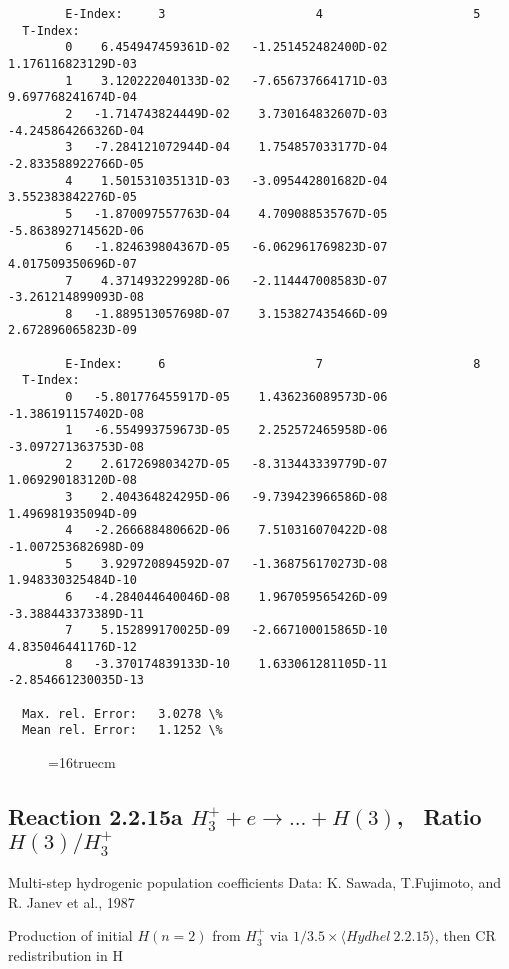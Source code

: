 \documentclass[12pt,dvipdfmx]{article}
\begin{document}
{\begin{small}
\begin{verbatim}
        E-Index:     3                     4                     5
  T-Index:
        0    6.454947459361D-02   -1.251452482400D-02    1.176116823129D-03
        1    3.120222040133D-02   -7.656737664171D-03    9.697768241674D-04
        2   -1.714743824449D-02    3.730164832607D-03   -4.245864266326D-04
        3   -7.284121072944D-04    1.754857033177D-04   -2.833588922766D-05
        4    1.501531035131D-03   -3.095442801682D-04    3.552383842276D-05
        5   -1.870097557763D-04    4.709088535767D-05   -5.863892714562D-06
        6   -1.824639804367D-05   -6.062961769823D-07    4.017509350696D-07
        7    4.371493229928D-06   -2.114447008583D-07   -3.261214899093D-08
        8   -1.889513057698D-07    3.153827435466D-09    2.672896065823D-09

        E-Index:     6                     7                     8
  T-Index:
        0   -5.801776455917D-05    1.436236089573D-06   -1.386191157402D-08
        1   -6.554993759673D-05    2.252572465958D-06   -3.097271363753D-08
        2    2.617269803427D-05   -8.313443339779D-07    1.069290183120D-08
        3    2.404364824295D-06   -9.739423966586D-08    1.496981935094D-09
        4   -2.266688480662D-06    7.510316070422D-08   -1.007253682698D-09
        5    3.929720894592D-07   -1.368756170273D-08    1.948330325484D-10
        6   -4.284044640046D-08    1.967059565426D-09   -3.388443373389D-11
        7    5.152899170025D-09   -2.667100015865D-10    4.835046441176D-12
        8   -3.370174839133D-10    1.633061281105D-11   -2.854661230035D-13

  Max. rel. Error:   3.0278 \%
  Mean rel. Error:   1.1252 \%

\end{verbatim}\end{small}
\begin{figure} \label{2.2.14e}
\epsfxsize=16truecm
\end{figure}
\newpage

\subsection{
Reaction 2.2.15a $ H_3^+ + e \rightarrow ...+ H(3) $, \   Ratio $H(3)/H_3^+  $
}

 Multi-step hydrogenic population coefficients
 Data: K. Sawada, T.Fujimoto,  \cite{kn:Sawada} and R. Janev et al., 1987

 Production of initial $H(n=2)$ from $H_3^+$ via $1/3.5 \times \langle Hydhel~ 2.2.15\rangle$,
 then CR redistribution in H

}
\end{document}

